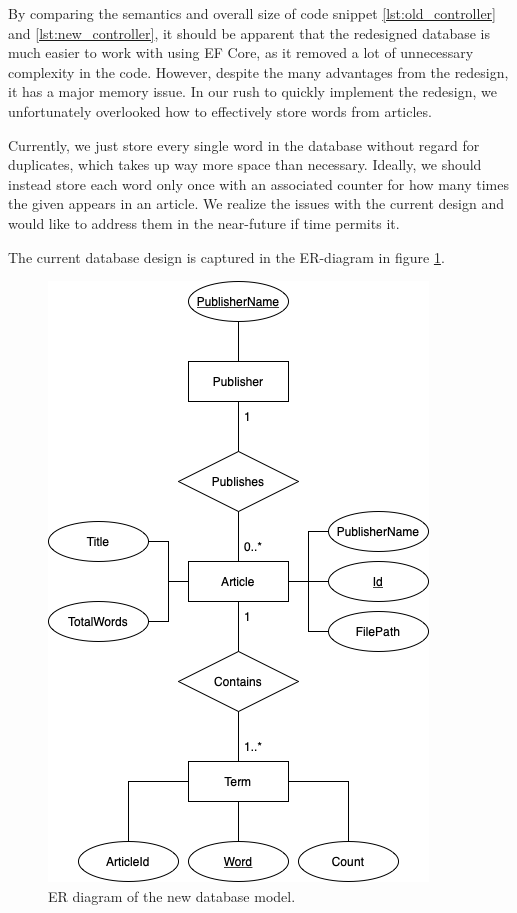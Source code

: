 By comparing the semantics and overall size of code snippet \ref{lst:old_controller} and \ref{lst:new_controller}, it should be apparent that the redesigned database is much easier to work with using EF Core, as it removed a lot of unnecessary complexity in the code.
However, despite the many advantages from the redesign, it has a major memory issue.
In our rush to quickly implement the redesign, we unfortunately overlooked how to effectively store words from articles. 

Currently, we just store every single word in the database without regard for duplicates, which takes up way more space than necessary.
Ideally, we should instead store each word only once with an associated counter for how many times the given appears in an article.
We realize the issues with the current design and would like to address them in the near-future if time permits it.

The current database design is captured in the ER-diagram in figure \ref{newdatabaseER}.

\begin{figure}[h]
    \centering
    \includegraphics[scale=0.8]{Images/New database model.png}
    \caption{ER diagram of the new database model.}
    \label{newdatabaseER}
\end{figure}
